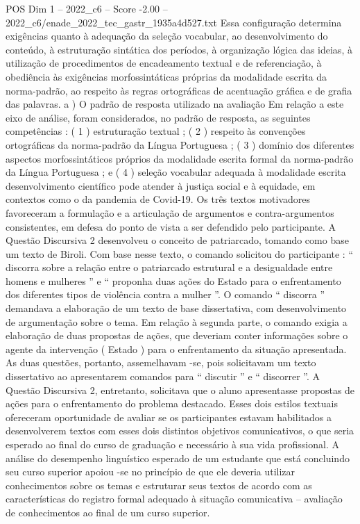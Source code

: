 \begin{textsample}{POS Dim 1 – 2022\_c6 – Score -2.00 – 2022\_c6/enade\_2022\_tec\_gastr\_1935a4d527.txt}
Essa configuração determina exigências quanto à adequação da seleção vocabular, ao desenvolvimento do conteúdo, à estruturação sintática dos períodos, à organização lógica das ideias, à utilização de procedimentos de encadeamento textual e de referenciação, à obediência às exigências morfossintáticas próprias da modalidade escrita da norma-padrão, ao respeito às regras ortográficas de acentuação gráfica e de grafia das palavras. a ) O padrão de resposta utilizado na avaliação Em relação a este eixo de análise, foram considerados, no padrão de resposta, as seguintes competências : ( 1 ) estruturação textual ; ( 2 ) respeito às convenções ortográficas da norma-padrão da Língua Portuguesa ; ( 3 ) domínio dos diferentes aspectos morfossintáticos próprios da modalidade escrita formal da norma-padrão da Língua Portuguesa ; e ( 4 ) seleção vocabular adequada à modalidade escrita desenvolvimento científico pode atender à justiça social e à equidade, em contextos como o da pandemia de Covid-19.
Os três textos motivadores favoreceram a formulação e a articulação de argumentos e contra-argumentos consistentes, em defesa do ponto de vista a ser defendido pelo participante.
A Questão Discursiva 2 desenvolveu o conceito de patriarcado, tomando como base um texto de Biroli.
Com base nesse texto, o comando solicitou do participante : “ discorra sobre a relação entre o patriarcado estrutural e a desigualdade entre homens e mulheres ” e “ proponha duas ações do Estado para o enfrentamento dos diferentes tipos de violência contra a mulher ”.
O comando “ discorra ” demandava a elaboração de um texto de base dissertativa, com desenvolvimento de argumentação sobre o tema.
Em relação à segunda parte, o comando exigia a elaboração de duas propostas de ações, que deveriam conter informações sobre o agente da intervenção ( Estado ) para o enfrentamento da situação apresentada.
As duas questões, portanto, assemelhavam -se, pois solicitavam um texto dissertativo ao apresentarem comandos para “ discutir ” e “ discorrer ”.
A Questão Discursiva 2, entretanto, solicitava que o aluno apresentasse propostas de ações para o enfrentamento do problema destacado.
Esses dois estilos textuais ofereceram oportunidade de avaliar se os participantes estavam habilitados a desenvolverem textos com esses dois distintos objetivos comunicativos, o que seria esperado ao final do curso de graduação e necessário à sua vida profissional.
A análise do desempenho linguístico esperado de um estudante que está concluindo seu curso superior apoiou -se no princípio de que ele deveria utilizar conhecimentos sobre os temas e estruturar seus textos de acordo com as características do registro formal adequado à situação comunicativa – avaliação de conhecimentos ao final de um curso superior.

\end{textsample}
